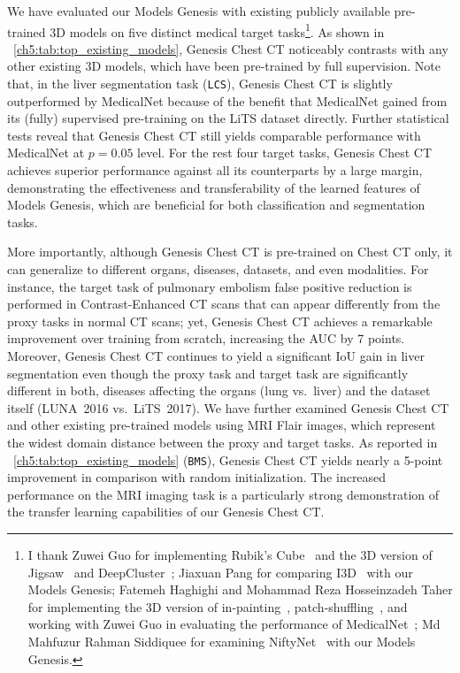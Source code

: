 We have evaluated our Models Genesis with existing publicly available pre-trained 3D models on five distinct medical target tasks\footnote{I thank Zuwei Guo for implementing Rubik's Cube~\citep{zhuang2019self} and the 3D version of Jigsaw~\citep{noroozi2016unsupervised} and DeepCluster~\citep{caron2018deep}; Jiaxuan Pang for comparing I3D~\citep{carreira2017quo} with our Models Genesis; Fatemeh Haghighi and Mohammad Reza Hosseinzadeh Taher for implementing the 3D version of in-painting~\citep{pathak2016context}, patch-shuffling~\citep{chen2019self}, and working with Zuwei Guo in evaluating the performance of MedicalNet~\citep{chen2019med3d}; Md Mahfuzur Rahman Siddiquee for examining NiftyNet~\citep{gibson2018niftynet} with our Models Genesis.}. As shown in \tablename~\ref{ch5:tab:top_existing_models}, Genesis Chest CT noticeably contrasts with any other existing 3D models, which have been pre-trained by full supervision. Note that, in the liver segmentation task (\texttt{LCS}), Genesis Chest CT is slightly outperformed by MedicalNet because of the benefit that MedicalNet gained from its (fully) supervised pre-training  on the LiTS dataset directly. Further statistical tests reveal that Genesis Chest CT still yields comparable performance with MedicalNet at $p=0.05$ level. For the rest four target tasks, Genesis Chest CT achieves superior performance against all its counterparts by a large margin, demonstrating the effectiveness and transferability of the learned features of Models Genesis, which are beneficial for both classification and segmentation tasks. 

More importantly, although Genesis Chest CT is pre-trained on Chest CT only, it can generalize to different organs, diseases, datasets, and even modalities. For instance, the target task of pulmonary embolism false positive reduction is performed in Contrast-Enhanced CT scans that can appear differently from the proxy tasks in normal CT scans; yet, Genesis Chest CT achieves a remarkable improvement over training from scratch, increasing the AUC by 7 points. Moreover, Genesis Chest CT continues to yield a significant IoU gain in liver segmentation even though the proxy task and target task are significantly different in both, diseases affecting the organs (lung vs.~liver) and the dataset itself (LUNA~2016 vs.~LiTS~2017). We have further examined Genesis Chest CT and other existing pre-trained models using MRI Flair images, which represent the widest domain distance between the proxy and target tasks. As reported in \tablename~\ref{ch5:tab:top_existing_models} (\texttt{BMS}), Genesis Chest CT yields nearly a 5-point improvement in comparison with random initialization. The increased performance on the MRI imaging task is a particularly strong demonstration of the transfer learning capabilities of our Genesis Chest CT. 

